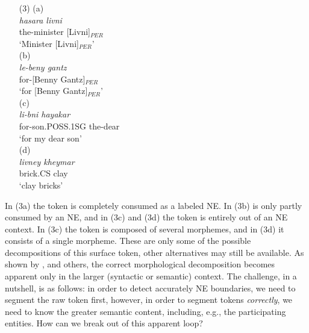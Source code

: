 \documentclass[11pt,a4paper]{article}
\begin{document}
\begin{itemize}
    \item[(3)] (a)  
    \\ \emph{hasara \hspace{1.2cm} livni}
    \\ {\small the-minister \hspace{0.6cm} [Livni]$_{PER}$}
    \\ `Minister [Livni]$_{PER}$' 
    \\ (b) 
    \\ {\em le-beny \hspace{1cm} gantz}
    \\ {\small for-[Benny \hspace{0.45cm} Gantz]$_{PER}$}
    \\ `for [Benny Gantz]$_{PER}$'
    \\ (c) 
    \\ {\em li-bni \hspace{2.3cm} hayakar}
    \\ {\small for-son.POSS.1SG \hspace{0.4cm} the-dear}
    \\ `for my dear son'
    \\ (d) 
    \\ {\em livney \hspace{1.2cm} kheymar}
    \\ {\small brick.CS \hspace{0.9cm} clay}
    \\ `clay bricks'
\end{itemize} 
In (3a) the token    is completely consumed as a labeled NE. In (3b)  is only partly consumed by an NE, and in (3c) and (3d) the token is entirely out of an NE context. In (3c) the token is composed of several morphemes, and in (3d) it consists of a single morpheme. These are only some of the possible decompositions of this surface token, other alternatives may still be available.
As shown by , and others,
the correct morphological decomposition becomes apparent only in the larger (syntactic or semantic) context. The challenge, in a nutshell, is as follows: in order to detect accurately NE boundaries, we need to segment the raw token first, however, in order to segment tokens {\em correctly}, we need to know the greater semantic content, including, e.g., the participating entities. How can we break out of this apparent loop?
\end{document}
